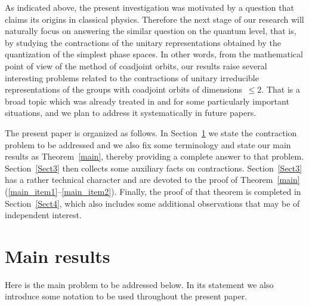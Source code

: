 \documentclass[
reqno]{amsart}
\begin{document}
As indicated above, the present investigation was motivated by a question 
that claims its origins in classical physics. 
Therefore the next stage of our research will naturally focus 
on answering the similar question on the quantum level, 
that is, by studying the contractions of the unitary representations 
obtained by the quantization of the simplest phase spaces. 
In other words, from the mathematical point of view of the method of coadjoint orbits, 
our results raise several interesting problems related to 
the contractions of unitary irreducible representations of the groups 
with coadjoint orbits of dimensions~$\le 2$. 
That is a broad topic which was already treated in \cite{Ca03} and \cite{Ca04} 
for some particularly important situations, 
and we plan to address it systematically in future papers.

The present paper is organized as follows. 
In Section~\ref{results} we state the contraction problem to be addressed 
and we also fix some terminology and state our main results 
as Theorem~\ref{main}, thereby providing a complete answer to that problem. 
Section~\ref{Sect3} then collects some auxiliary facts on contractions. 
Section~\ref{Sect3} has a rather technical character 
and are devoted to the proof of Theorem~\ref{main}(\eqref{main_item1}--\eqref{main_item2}). 
Finally, the proof of that theorem is completed in Section~\ref{Sect4}, 
which also includes
some additional observations that may be of independent interest. 

\section{Main results}\label{results}

Here is  the main problem to be addressed below. 
In its statement we also introduce some notation to be used throughout the present paper.  
\end{document}
